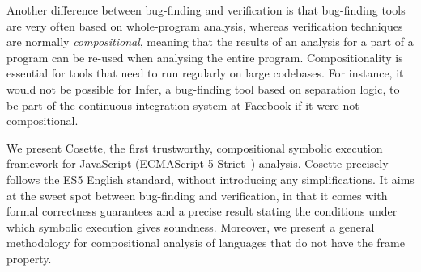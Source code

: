 \documentclass[sigconf, anonymous, review]{acmart}
\newcommand{\jsil}{JSIL\xspace}
\newcommand{\cosette}{Cosette\xspace}
\begin{document}
Another difference between bug-finding and verification is that bug-finding tools are very often based on whole-program analysis, whereas verification techniques are normally \emph{compositional}, meaning that the results of an analysis for a part of a program can be re-used when analysing the entire program. Compositionality is essential for tools that need to run regularly on large codebases. For instance, it would not be possible for Infer, a bug-finding tool based on separation logic, to be part of the continuous integration system at Facebook if it were not compositional.

We present \cosette, the first trustworthy, compositional symbolic execution framework for JavaScript (ECMAScript 5 Strict~\cite{ecma}) analysis. \cosette precisely follows the ES5 English standard, without introducing any simplifications. 
It aims at the sweet spot between bug-finding and verification, 
in that it comes with formal correctness guarantees and a precise result stating the conditions under which symbolic execution gives soundness. Moreover, we present a general methodology for compositional analysis of languages that do not have the frame property.






\end{document}

